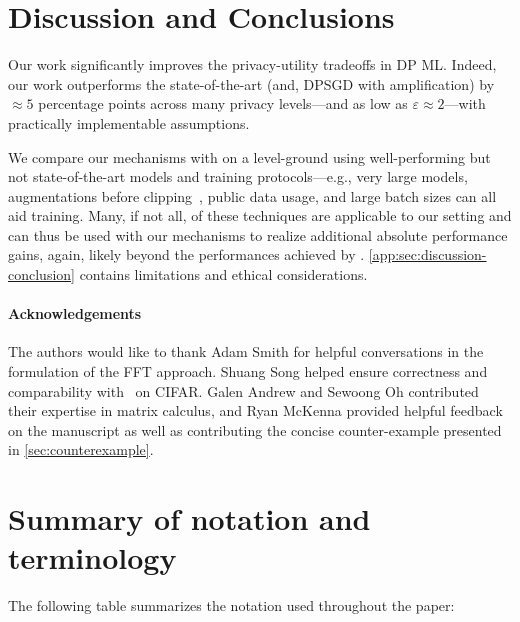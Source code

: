 \documentclass{article} %
\theoremstyle{named}
\begin{document}
\vspace{-1em}
\section{Discussion and Conclusions}
Our work significantly improves the privacy-utility tradeoffs in DP ML.
Indeed, our work outperforms the state-of-the-art (and, DPSGD with amplification) by $\approx 5$ percentage points across many privacy levels---and as low as $\varepsilon\approx 2$---with practically implementable assumptions. 

We compare our mechanisms with \DPSGD on a level-ground using well-performing but not state-of-the-art models and training protocols---e.g., very large models, augmentations before clipping~\citep{de2022unlocking}, public data usage, and large batch sizes can all aid training. Many, if not all, of these techniques are applicable to our setting and can thus be used with our mechanisms to realize additional absolute performance gains, again, likely beyond the performances achieved by \DPSGD. \cref{app:sec:discussion-conclusion} contains limitations and ethical considerations.




 \paragraph{Acknowledgements}
The authors would like to thank Adam Smith for helpful conversations in the formulation of the FFT approach. Shuang Song helped ensure correctness and comparability with~\citet{kairouz2021practical} on CIFAR. Galen Andrew and Sewoong Oh contributed their expertise in matrix calculus, and Ryan McKenna provided helpful feedback on the manuscript as well as contributing the concise counter-example presented in \cref{sec:counterexample}.


\clearpage



\clearpage
\appendix
\onecolumn

\section{Summary of notation and terminology}\label{sec:notation}
The following table summarizes the notation used throughout the paper:
\end{document}
